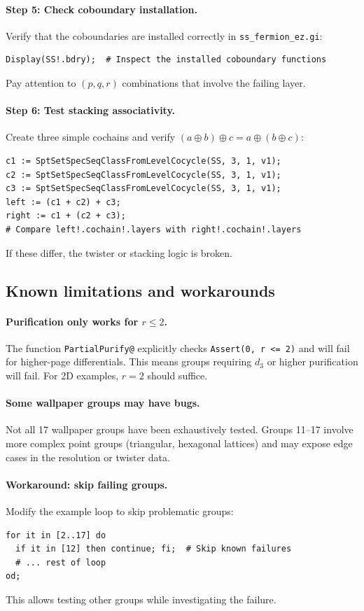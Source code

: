 \documentclass{SciPost}
\begin{document}
\paragraph{Step 5: Check coboundary installation.}
Verify that the coboundaries are installed correctly in \texttt{ss\_fermion\_ez.gi}:
\begin{verbatim}
Display(SS!.bdry);  # Inspect the installed coboundary functions
\end{verbatim}
Pay attention to $(p,q,r)$ combinations that involve the failing layer.

\paragraph{Step 6: Test stacking associativity.}
Create three simple cochains and verify $(a \oplus b) \oplus c = a \oplus (b \oplus c)$:
\begin{verbatim}
c1 := SptSetSpecSeqClassFromLevelCocycle(SS, 3, 1, v1);
c2 := SptSetSpecSeqClassFromLevelCocycle(SS, 3, 1, v1);
c3 := SptSetSpecSeqClassFromLevelCocycle(SS, 3, 1, v1);
left := (c1 + c2) + c3;
right := c1 + (c2 + c3);
# Compare left!.cochain!.layers with right!.cochain!.layers
\end{verbatim}
If these differ, the twister or stacking logic is broken.

\subsection{Known limitations and workarounds}

\paragraph{Purification only works for $r \leq 2$.}
The function \texttt{PartialPurify@} explicitly checks \texttt{Assert(0, r <= 2)} and will fail for higher-page differentials.
This means groups requiring $d_3$ or higher purification will fail.
For 2D examples, $r=2$ should suffice.

\paragraph{Some wallpaper groups may have bugs.}
Not all 17 wallpaper groups have been exhaustively tested.
Groups 11--17 involve more complex point groups (triangular, hexagonal lattices) and may expose edge cases in the resolution or twister data.

\paragraph{Workaround: skip failing groups.}
Modify the example loop to skip problematic groups:
\begin{verbatim}
for it in [2..17] do
  if it in [12] then continue; fi;  # Skip known failures
  # ... rest of loop
od;
\end{verbatim}
This allows testing other groups while investigating the failure.
\end{document}
